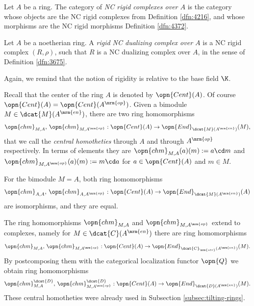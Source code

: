 \begin{dfn} \label{dfn:4380}
Let $A$ be a ring. The category of {\em NC rigid complexes over $A$} 
is the category whose objects are the NC rigid complexes from Definition 
\ref{dfn:4216}, and whose morphisms are the NC rigid morphisms  Definition 
\ref{dfn:4372}.
\end{dfn}

\begin{dfn} \label{dfn:4375}
Let $A$ be a noetherian ring. A {\em rigid NC dualizing complex over $A$} 
is a NC rigid complex $(R, \rho)$, such that $R$ is a NC dualizing complex over 
$A$, in the sense of Definition \ref{dfn:3675}.
\end{dfn}

Again, we remind that the notion of rigidity is relative to the base field 
$\K$. 

Recall that the center of the ring $A$ is denoted by $\opn{Cent}(A)$. 
Of course $\opn{Cent}(A) = \opn{Cent}(A^{\mrm{op}})$. 
Given a bimodule $M \in \dcat{M}(A^{\mrm{en}})$, there are two ring 
homomorphisms
\[ \opn{chm}_{M, A}, \, \opn{chm}_{M, A^{\mrm{op}}} : 
\opn{Cent}(A) \to \opn{End}_{\dcat{M}(A^{\mrm{en}})}(M) , \]
that we call the 
{\em central homotheties}%
through $A$ and through 
$A^{\mrm{op}}$ respectively.  In terms of elements they are 
$\opn{chm}_{M, A}(a)(m) := a \cd m$ and
$\opn{chm}_{M, A^{\mrm{op}}}(a)(m) := m \cd a$ 
for $a \in \opn{Cent}(A)$ and $m \in M$. 

\begin{exa} \label{exa:4375}
For the bimodule $M = A$, both ring homomorphisms
\[ \opn{chm}_{A, A}, \, \opn{chm}_{A, A^{\mrm{op}}} : 
\opn{Cent}(A) \to \opn{End}_{\dcat{M}(A^{\mrm{en}})}(A) \]
are isomorphisms, and they are equal. 
\end{exa}

The ring homomorphisms $\opn{chm}_{M, A}$ and $\opn{chm}_{M, A^{\mrm{op}}}$ 
extend to complexes, namely for  $M \in \dcat{C}(A^{\mrm{en}})$ 
there are ring homomorphisms 
\[ \opn{chm}_{M, A}, \, \opn{chm}_{M, A^{\mrm{op}}} : 
\opn{Cent}(A) \to \opn{End}_{\dcat{C}_{\mrm{str}}(A^{\mrm{en}})}(M) . \]
By postcomposing them with the categorical localization functor $\opn{Q}$ we 
obtain ring homomorphisms 
\[ \opn{chm}^{\dcat{D}}_{M, A}, \, \opn{chm}^{\dcat{D}}_{M,  A^{\mrm{op}}} : 
\opn{Cent}(A) \to \opn{End}_{\dcat{D}(A^{\mrm{en}})}(M) . \]
These central homotheties were already used in Subsection 
\ref{subsec:tilting-rings}.

